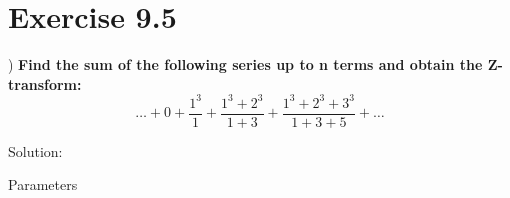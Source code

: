 \documentclass[journal,12pt,twocolumn]{article}
\begin{document}


\vspace{3cm}

\title{}
\author{EE23BTECH11217 - Prajwal M$^{*}$
}
\maketitle
\newpage
\bigskip

\renewcommand{\thefigure}{\theenumi}
\renewcommand{\thetable}{\theenumi}

\section*{Exercise 9.5}
) \hspace{2pt} \textbf{Find the sum of the following series up to n terms and obtain the Z-transform:}
$$ 
\ldots + 0 + \frac{1^3}{1} + \frac{1^3 + 2^3}{1 + 3} + \frac{1^3 + 2^3 + 3^3}{1 + 3 + 5} + \ldots$$

\noindent Solution: 

\begin{table}[h]
    \centering
    
    \caption{Parameters}
    \label{tab: 11.9.5.25.1}
\end{table}
\end{document}
